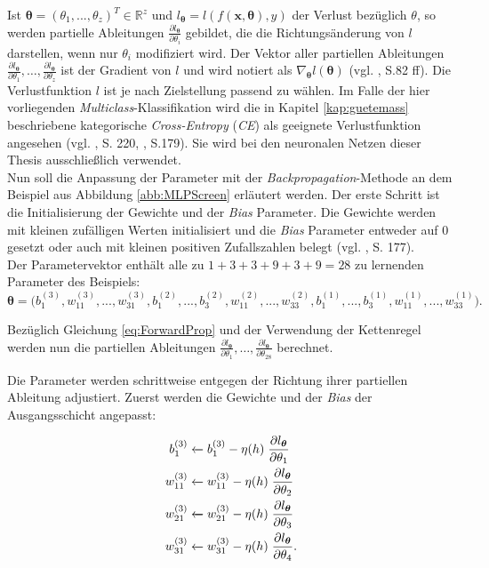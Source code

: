 \documentclass[a4paper,11pt]{article}
\begin{document}
Ist $\bm{\theta} = (\theta_1, ..., \theta_z)^T \in \mathbb{R}^z$ und $l_{\bm{\theta}} = l (f(\bm{x}, \bm{\theta}), y)$ der Verlust bezüglich $\theta$, so werden partielle Ableitungen $\frac{\partial l_{\bm{\theta}}}{\partial \theta_i} $ gebildet, die die Richtungsänderung von $l$ darstellen, wenn nur $\theta_i$ modifiziert wird. Der Vektor aller partiellen Ableitungen $\frac{\partial l_{\bm{\theta}}}{\partial \theta_1} , \dots, \frac{\partial l_{\bm{\theta}}}{\partial \theta_z} $ ist der Gradient von $l$ und wird notiert als $\nabla_{\bm{\theta}} l(\bm{\theta})$ (vgl. \cite{deepL}, S.82 ff). Die Verlustfunktion $l$ ist je nach Zielstellung passend zu wählen. Im Falle der hier vorliegenden \textit{Multiclass}-Klassifikation wird die in Kapitel \ref{kap:guetemass} beschriebene kategorische \textit{Cross-Entropy} (\textit{CE}) als geeignete Verlustfunktion angesehen (vgl. \cite{deepEssentials}, S. 220, \cite{keras}, S.179). Sie wird bei den neuronalen Netzen dieser Thesis ausschließlich verwendet.\\

Nun soll die Anpassung der Parameter mit der \textit{Backpropagation}-Methode an dem Beispiel aus Abbildung \ref{abb:MLPScreen} erläutert werden.
Der erste Schritt ist die Initialisierung der Gewichte und der \textit{Bias} Parameter. Die Gewichte werden mit kleinen zufälligen Werten initialisiert und die \textit{Bias} Parameter entweder auf $0$ gesetzt oder auch mit kleinen positiven Zufallszahlen belegt (vgl. \cite{deepL}, S. 177). \\
Der Parametervektor enthält alle zu $1+3+3+9+3+9 = 28$ zu lernenden Parameter des Beispiels:
\[ \bm{\theta} = \bigl( b_1^{(3)}, w_{11}^{(3)}, ...,w_{31}^{(3)}, b_1^{(2)}, ..., b_3^{(2)},
w_{11}^{(2)}, ...,w_{33}^{(2)}, b_1^{(1)}, ..., b_3^{(1)},  
w_{11}^{(1)}, ...,w_{33}^{(1)} \bigr).
\]

Bezüglich Gleichung \ref{eq:ForwardProp} und der Verwendung der Kettenregel werden nun die partiellen Ableitungen $\frac{\partial l_{\bm{\theta}}}{\partial \theta_1} , \dots, \frac{\partial l_{\bm{\theta}}}{\partial \theta_{28}} $ berechnet.  

Die Parameter werden schrittweise entgegen der Richtung ihrer partiellen Ableitung adjustiert. Zuerst werden die Gewichte und der \textit{Bias} der Ausgangsschicht angepasst:

\begin{align*}
     b_1^{(3)} &\xleftarrow{}  b_1^{(3)} - \eta(h) \hspace{0.1cm} \frac{\partial l_{\bm{\theta}}}{\partial \theta_1} \\
      w_{11}^{(3)} &\xleftarrow{} w_{11}^{(3)} - \eta(h) \hspace{0.1cm} \frac{\partial l_{\bm{\theta}}}{\partial \theta_2} \\
     w_{21}^{(3)} &\xleftarrow{} w_{21}^{(3)} - \eta(h) \hspace{0.1cm} \frac{\partial l_{\bm{\theta}}}{\partial \theta_3} \\
     w_{31}^{(3)} &\xleftarrow{} w_{31}^{(3)} - \eta(h) \hspace{0.1cm} \frac{\partial l_{\bm{\theta}}}{\partial \theta_4} .
\end{align*}
  
\end{document}
